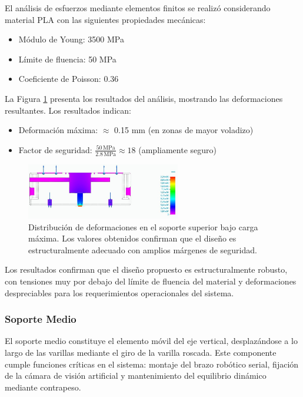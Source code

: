 El análisis de esfuerzos mediante elementos finitos se realizó considerando material PLA con las siguientes propiedades mecánicas:

\begin{itemize}[label=$\bullet$]
    \item Módulo de Young: 3500 MPa
    \item Límite de fluencia: 50 MPa
    \item Coeficiente de Poisson: 0.36
\end{itemize}

La Figura \ref{fig:SuperiorReal_simplificado_tensiones} presenta los resultados del análisis, mostrando las deformaciones resultantes. Los resultados indican:

\begin{itemize}[label=$\bullet$]
    \item Deformación máxima: $\approx$ 0.15 mm (en zonas de mayor voladizo)
    \item Factor de seguridad: $\frac{50\,\text{MPa}}{2.8\,\text{MPa}} \approx 18$ (ampliamente seguro)
\end{itemize}

\begin{figure}[H]
    \centering
    \includegraphics[width=0.6\textwidth]{img/SuperiorReal_simplificado_tensiones.jpg}
    \caption{Distribución de deformaciones en el soporte superior bajo carga máxima. Los valores obtenidos confirman que el diseño es estructuralmente adecuado con amplios márgenes de seguridad.}
    \label{fig:SuperiorReal_simplificado_tensiones}
\end{figure}

Los resultados confirman que el diseño propuesto es estructuralmente robusto, con tensiones muy por debajo del límite de fluencia del material y deformaciones despreciables para los requerimientos operacionales del sistema.

\subsubsection{Soporte Medio}

El soporte medio constituye el elemento móvil del eje vertical, desplazándose a lo largo de las varillas mediante el giro de la varilla roscada. Este componente cumple funciones críticas en el sistema: montaje del brazo robótico serial, fijación de la cámara de visión artificial y mantenimiento del equilibrio dinámico mediante contrapeso.

